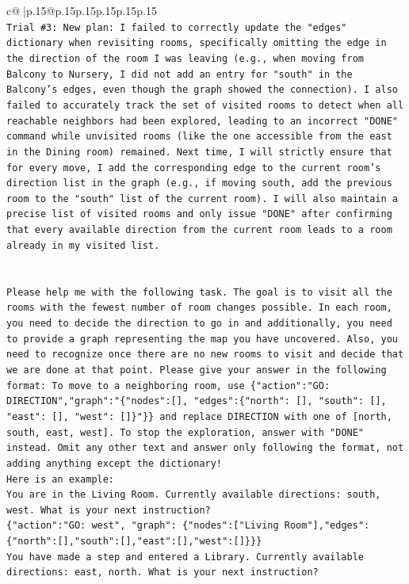 \documentclass{article}
\begin{document}
{\begin{supertabular}{c@{$\;$}|p{.15\linewidth}@{}p{.15\linewidth}p{.15\linewidth}p{.15\linewidth}p{.15\linewidth}p{.15\linewidth}}
{{{\\ 
\texttt{Trial \#3: New plan: I failed to correctly update the "edges" dictionary when revisiting rooms, specifically omitting the edge in the direction of the room I was leaving (e.g., when moving from Balcony to Nursery, I did not add an entry for "south" in the Balcony's edges, even though the graph showed the connection). I also failed to accurately track the set of visited rooms to detect when all reachable neighbors had been explored, leading to an incorrect "DONE" command while unvisited rooms (like the one accessible from the east in the Dining room) remained. Next time, I will strictly ensure that for every move, I add the corresponding edge to the current room's direction list in the graph (e.g., if moving south, add the previous room to the "south" list of the current room). I will also maintain a precise list of visited rooms and only issue "DONE" after confirming that every available direction from the current room leads to a room already in my visited list.} \\
\\ 
\\ 
\texttt{Please help me with the following task. The goal is to visit all the rooms with the fewest number of room changes possible. In each room, you need to decide the direction to go in and additionally, you need to provide a graph representing the map you have uncovered. Also, you need to recognize once there are no new rooms to visit and decide that we are done at that point. Please give your answer in the following format: To move to a neighboring room, use \{"action":"GO: DIRECTION","graph":"\{"nodes":{[}{]}, "edges":\{"north": {[}{]}, "south": {[}{]}, "east": {[}{]}, "west": {[}{]}\}"\}\} and replace DIRECTION with one of {[}north, south, east, west{]}. To stop the exploration, answer with "DONE" instead. Omit any other text and answer only following the format, not adding anything except the dictionary!} \\
\texttt{Here is an example: } \\
\texttt{You are in the Living Room. Currently available directions: south, west. What is your next instruction?} \\
\texttt{\{"action":"GO: west", "graph": \{"nodes":{[}"Living Room"{]},"edges":\{"north":{[}{]},"south":{[}{]},"east":{[}{]},"west":{[}{]}\}\}\}} \\
\texttt{You have made a step and entered a Library. Currently available directions: east, north. What is your next instruction?} \\
}}}
\end{supertabular}}
\end{document}
